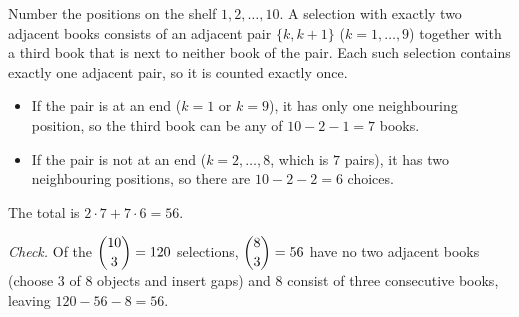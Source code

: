 Number the positions on the shelf $1,2,\dots,10$. A selection with exactly two adjacent books consists of an adjacent pair $\{k,k+1\}$ ($k=1,\dots,9$) together with a third book that is next to neither book of the pair. Each such selection contains exactly one adjacent pair, so it is counted exactly once.
\begin{itemize}
\item If the pair is at an end ($k=1$ or $k=9$), it has only one neighbouring position, so the third book can be any of $10-2-1=7$ books.
\item If the pair is not at an end ($k=2,\dots,8$, which is $7$ pairs), it has two neighbouring positions, so there are $10-2-2=6$ choices.
\end{itemize}
The total is $2\cdot7+7\cdot6=\boxed{56}$.

\emph{Check.} Of the $\dbinom{10}{3}=120$ selections, $\dbinom{8}{3}=56$ have no two adjacent books (choose $3$ of $8$ objects and insert gaps) and $8$ consist of three consecutive books, leaving $120-56-8=56$.
